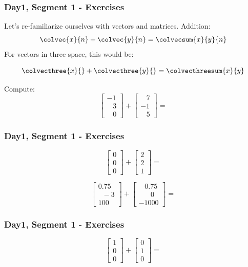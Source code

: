 
\begin{enumerate}
\begin{frame}

  \frametitle{Day1, Segment 1 - Exercises}
\item Let's re-familiarize ourselves with vectors and matrices.  
Addition:
\[\colvec{x}{n}+\colvec{y}{n}=\colvecsum{x}{y}{n}\]
For vectors in three space, this would be:

\[\colvecthree{x}{}+\colvecthree{y}{}=\colvecthreesum{x}{y}\] 

Compute:
\[
\begin{bmatrix}
-1\\
\;\;\;3\\
\;\;\;0 \end{bmatrix}
+
\begin{bmatrix}
\;\;\;7\\
-1\\
\;\;\;5 \end{bmatrix}=
\]

\end{frame}


\begin{frame}

  \frametitle{Day1, Segment 1 - Exercises}
\[
\begin{bmatrix}
0\\
0\\
0 \end{bmatrix}
+
\begin{bmatrix}
2\\
2\\
1 \end{bmatrix}=
\]

\[
\begin{bmatrix}
0.75\\
\;\;-3\\
100 \end{bmatrix}
+
\begin{bmatrix}
\;\;\;0.75\\
\;\;\;\;\;\;0\\
-1000 \end{bmatrix}=
\]

\end{frame}


\begin{frame}

  \frametitle{Day1, Segment 1 - Exercises}
\[
\begin{bmatrix}
1\\
0\\
0 \end{bmatrix}
+
\begin{bmatrix}
0\\
1\\
0 \end{bmatrix}=
\]


\end{frame}
\end{enumerate}
